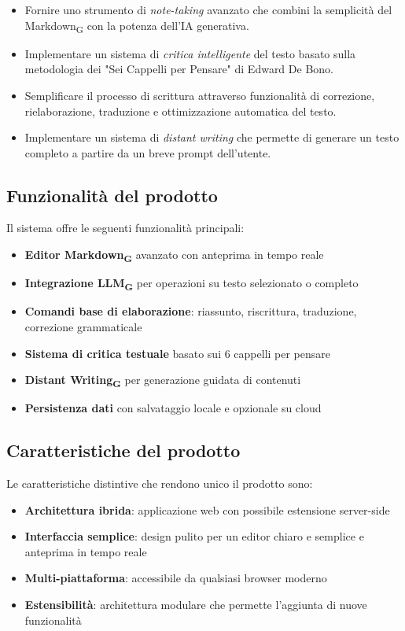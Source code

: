 \documentclass[11pt,a4paper]{article}
\begin{document}
\begin{itemize}
    \item Fornire uno strumento di \textit{note-taking} avanzato che combini la semplicità del Markdown\textsubscript{G} con la potenza dell'IA generativa.
    \item Implementare un sistema di \textit{critica intelligente} del testo basato sulla metodologia dei "Sei Cappelli per Pensare" di Edward De Bono.
    \item Semplificare il processo di scrittura attraverso funzionalità di correzione, rielaborazione, traduzione e ottimizzazione automatica del testo.
    \item Implementare un sistema di \textit{distant writing} che permette di generare un testo completo a partire da un breve prompt dell'utente.
\end{itemize}


\subsection{Funzionalità del prodotto}
Il sistema offre le seguenti funzionalità principali:

\begin{itemize}
    \item \textbf{Editor Markdown\textsubscript{G}} avanzato con anteprima in tempo reale
    \item \textbf{Integrazione LLM\textsubscript{G}} per operazioni su testo selezionato o completo
    \item \textbf{Comandi base di elaborazione}: riassunto, riscrittura, traduzione, correzione grammaticale
    \item \textbf{Sistema di critica testuale} basato sui 6 cappelli per pensare
    \item \textbf{Distant Writing\textsubscript{G}} per generazione guidata di contenuti
    \item \textbf{Persistenza dati} con salvataggio locale e opzionale su cloud
\end{itemize}

\subsection{Caratteristiche del prodotto}
Le caratteristiche distintive che rendono unico il prodotto sono:

\begin{itemize}
    \item \textbf{Architettura ibrida}: applicazione web con possibile estensione server-side
    \item \textbf{Interfaccia semplice}: design pulito per un editor chiaro e semplice e anteprima in tempo reale
    \item \textbf{Multi-piattaforma}: accessibile da qualsiasi browser moderno
    \item \textbf{Estensibilità}: architettura modulare che permette l'aggiunta di nuove funzionalità
    
\end{itemize}
\end{document}
